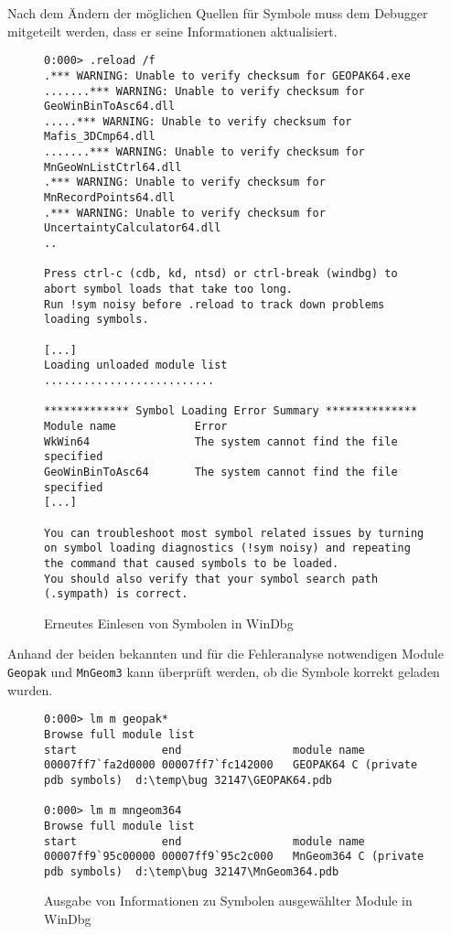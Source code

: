 Nach dem Ändern der möglichen Quellen für Symbole muss dem Debugger mitgeteilt werden, dass er seine Informationen aktualisiert.

\begin{figure}[H]
\begin{lstlisting}
0:000> .reload /f
.*** WARNING: Unable to verify checksum for GEOPAK64.exe
.......*** WARNING: Unable to verify checksum for GeoWinBinToAsc64.dll
.....*** WARNING: Unable to verify checksum for Mafis_3DCmp64.dll
.......*** WARNING: Unable to verify checksum for MnGeoWnListCtrl64.dll
.*** WARNING: Unable to verify checksum for MnRecordPoints64.dll
.*** WARNING: Unable to verify checksum for UncertaintyCalculator64.dll
..

Press ctrl-c (cdb, kd, ntsd) or ctrl-break (windbg) to abort symbol loads that take too long.
Run !sym noisy before .reload to track down problems loading symbols.

[...]
Loading unloaded module list
..........................

************* Symbol Loading Error Summary **************
Module name            Error
WkWin64                The system cannot find the file specified
GeoWinBinToAsc64       The system cannot find the file specified
[...]

You can troubleshoot most symbol related issues by turning on symbol loading diagnostics (!sym noisy) and repeating the command that caused symbols to be loaded.
You should also verify that your symbol search path (.sympath) is correct.
\end{lstlisting}
\caption{Erneutes Einlesen von Symbolen in WinDbg}
\end{figure}

Anhand der beiden bekannten und für die Fehleranalyse notwendigen Module \verb|Geopak| und \verb|MnGeom3| kann überprüft werden, ob die Symbole korrekt geladen wurden.

\begin{figure}[H]
\begin{lstlisting}
0:000> lm m geopak*
Browse full module list
start             end                 module name
00007ff7`fa2d0000 00007ff7`fc142000   GEOPAK64 C (private pdb symbols)  d:\temp\bug 32147\GEOPAK64.pdb

0:000> lm m mngeom364
Browse full module list
start             end                 module name
00007ff9`95c00000 00007ff9`95c2c000   MnGeom364 C (private pdb symbols)  d:\temp\bug 32147\MnGeom364.pdb
\end{lstlisting}
\caption{Ausgabe von Informationen zu Symbolen ausgewählter Module in WinDbg}
\end{figure}

